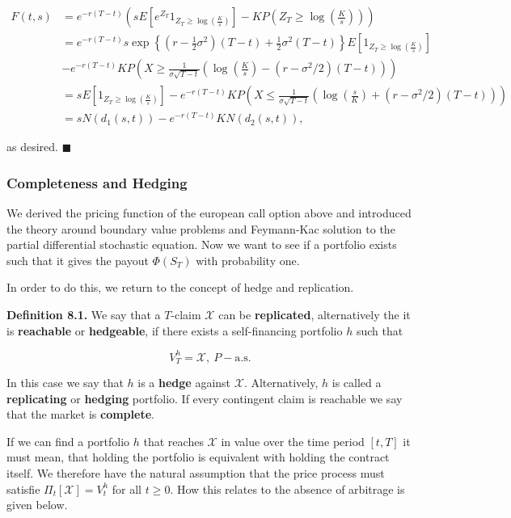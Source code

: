 \documentclass[
]{article}
\begin{document}
\begin{align*}
F(t,s)&=e^{-r(T-t)}\left(sE\left[e^{Z_T}1_{Z_T\ge \log\left(\frac{K}{s}\right)}\right]-K P\left(Z_T\ge \log\left(\frac{K}{s}\right)\right)\right)\\
&=e^{-r(T-t)}s\exp\left\{\left(r-\frac{1}{2}\sigma^2\right)(T-t)+\frac{1}{2}\sigma^2(T-t)\right\}E\left[1_{Z_T\ge \log\left(\frac{K}{s}\right)}\right]\\
&-e^{-r(T-t)}K P\left(X\ge\frac{1}{\sigma\sqrt{T-t}}\left( \log\left(\frac{K}{s}\right)-(r-\sigma^2/2)(T-t)\right)\right)\\
&=sE\left[1_{Z_T\ge \log\left(\frac{K}{s}\right)}\right]-e^{-r(T-t)}K P\left(X\le\frac{1}{\sigma\sqrt{T-t}}\left(\log\left(\frac{s}{K}\right)+(r-\sigma^2/2)(T-t)\right)\right)\\
&=sN(d_1(s,t))-e^{-r(T-t)}K N\left(d_2(s,t)\right),
\end{align*}

as desired. \(\blacksquare\)

\hypertarget{completeness-and-hedging}{%
\subsubsection{Completeness and
Hedging}\label{completeness-and-hedging}}

We derived the pricing function of the european call option above and
introduced the theory around boundary value problems and Feymann-Kac
solution to the partial differential stochastic equation. Now we want to
see if a portfolio exists such that it gives the payout \(\Phi(S_T)\)
with probability one.

In order to do this, we return to the concept of hedge and replication.

\textbf{Definition 8.1.} We say that a \(T\)-claim \(\mathcal{X}\) can
be \textbf{replicated}, alternatively the it is \textbf{reachable} or
\textbf{hedgeable}, if there exists a self-financing portfolio \(h\)
such that

\[
V_T^h=\mathcal{X},\ P-\text{a.s.}\tag{8.1}
\]

In this case we say that \(h\) is a \textbf{hedge} against
\(\mathcal{X}\). Alternatively, \(h\) is called a \textbf{replicating}
or \textbf{hedging} portfolio. If every contingent claim is reachable we
say that the market is \textbf{complete}.

If we can find a portfolio \(h\) that reaches \(\mathcal{X}\) in value
over the time period \([t,T]\) it must mean, that holding the portfolio
is equivalent with holding the contract itself. We therefore have the
natural assumption that the price process must satisfie
\(\Pi_t[\mathcal{X}]=V_t^h\) for all \(t\ge 0\). How this relates to the
absence of arbitrage is given below.
\end{document}
